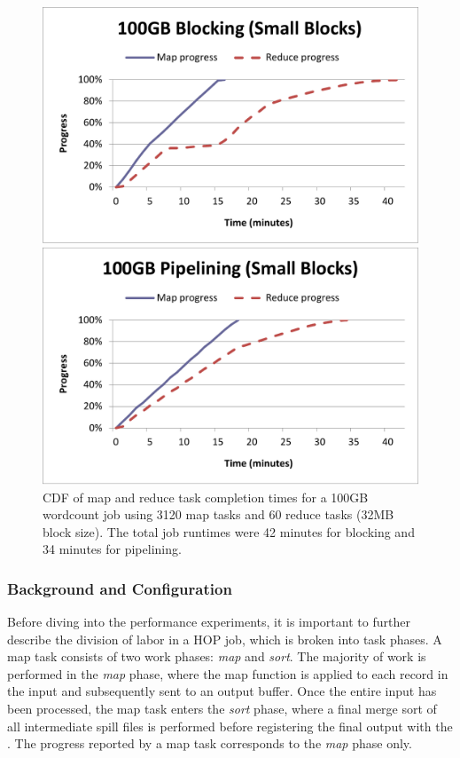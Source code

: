 \begin{figure}[t]
\ssp
\begin{minipage}{0.5\linewidth}
  \centering
        \includegraphics[width=0.95\linewidth]{figures/wc_100gb_3120m60r_blocking}
\end{minipage}
\begin{minipage}{0.5\linewidth}
  \centering
        \includegraphics[width=0.95\linewidth]{figures/wc_100gb_3120m60r_pipeline}
\end{minipage}
\caption{CDF of map and reduce task completion times for a 100GB wordcount job
  using 3120 map tasks and 60 reduce tasks (32MB block size). The total job
  runtimes were 42 minutes for blocking and 34 minutes for pipelining.}
\label{fig:wc5}
\end{figure}

\subsubsection{Background and Configuration}
Before diving into the performance experiments, it is important to further
describe the division of labor in a HOP job, which is broken into task phases. A
map task consists of two work phases: {\em map} and {\em sort}. The majority
of work is performed in the {\em map} phase, where the map function is applied
to each record in the input and subsequently sent to an output buffer.  Once the
entire input has been processed, the map task enters the {\em sort} phase, where
a final merge sort of all intermediate spill files is performed before
registering the final output with the \TT. The progress reported by a map task
corresponds to the {\em map} phase only.

